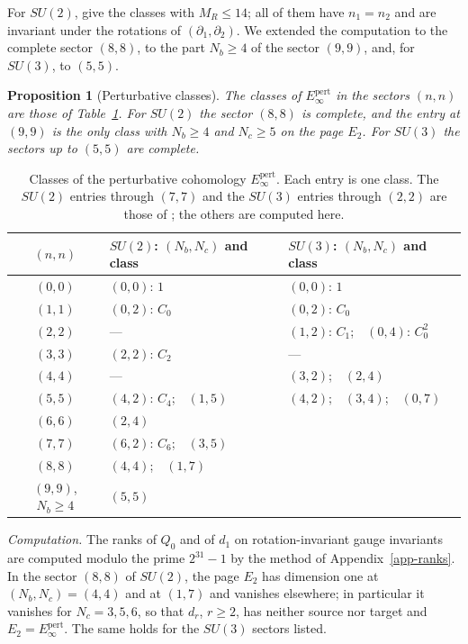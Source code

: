 \documentclass[11pt]{article}
\numberwithin{equation}{section}
\numberwithin{figure}{section}
\numberwithin{table}{section}
\newtheorem{proposition}[theorem]{Proposition}
\theoremstyle{definition}
\newcommand{\Ep}{E_\infty^{\mathrm{pert}}}
\begin{document}
For $SU(2)$, \cite[Equation~(8.11) and Table~3]{semichiral} give the classes with $M_R\le14$; all of them have $n_1=n_2$ and are invariant under the rotations of $(\partial_1,\partial_2)$. We extended the computation to the complete sector $(8,8)$, to the part $N_b\ge4$ of the sector $(9,9)$, and, for $SU(3)$, to $(5,5)$.

\begin{proposition}[Perturbative classes]\label{prop-census}
The classes of $\Ep$ in the sectors $(n,n)$ are those of Table~\ref{tab-census}. For $SU(2)$ the sector $(8,8)$ is complete, and the entry at $(9,9)$ is the only class with $N_b\ge4$ and $N_c\ge5$ on the page $E_2$. For $SU(3)$ the sectors up to $(5,5)$ are complete.
\end{proposition}

\begin{table}[H]
\centering
\begin{tabular}{@{}c|l|l@{}}
\toprule
$(n,n)$ & $SU(2)$: $(N_b,N_c)$ and class & $SU(3)$: $(N_b,N_c)$ and class\\
\midrule
$(0,0)$ & $(0,0)$: $1$ & $(0,0)$: $1$\\
$(1,1)$ & $(0,2)$: $C_0$ & $(0,2)$: $C_0$\\
$(2,2)$ & --- & $(1,2)$: $C_1$;\ \ $(0,4)$: $C_0^2$\\
$(3,3)$ & $(2,2)$: $C_2$ & ---\\
$(4,4)$ & --- & $(3,2)$;\ \ $(2,4)$\\
$(5,5)$ & $(4,2)$: $C_4$;\ \ $(1,5)$ & $(4,2)$;\ \ $(3,4)$;\ \ $(0,7)$\\
$(6,6)$ & $(2,4)$ & \\
$(7,7)$ & $(6,2)$: $C_6$;\ \ $(3,5)$ & \\
$(8,8)$ & $(4,4)$;\ \ $(1,7)$ & \\
$(9,9)$, $N_b\ge4$ & $(5,5)$ & \\
\bottomrule
\end{tabular}
\caption{Classes of the perturbative cohomology $\Ep$. Each entry is one class. The $SU(2)$ entries through $(7,7)$ and the $SU(3)$ entries through $(2,2)$ are those of \cite[Equations~(8.8), (8.9), (8.11)]{semichiral}; the others are computed here.}
\label{tab-census}
\end{table}

\begin{proofbox}
\emph{Computation.} The ranks of $Q_0$ and of $d_1$ on rotation-invariant gauge invariants are computed modulo the prime $2^{31}-1$ by the method of Appendix~\ref{app-ranks}. In the sector $(8,8)$ of $SU(2)$, the page $E_2$ has dimension one at $(N_b,N_c)=(4,4)$ and at $(1,7)$ and vanishes elsewhere; in particular it vanishes for $N_c=3,5,6$, so that $d_r$, $r\ge2$, has neither source nor target and $E_2=\Ep$. The same holds for the $SU(3)$ sectors listed.
\end{proofbox}
\end{document}
